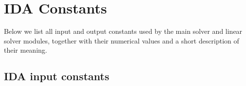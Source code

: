 \chapter{IDA Constants}\label{c:constants}

Below we list all input and output constants used by the main solver and 
linear solver modules, together with their numerical values and a short
description of their meaning.


\newlength{\tcolone}
\newlength{\tcoltwo}
\settowidth{\tcoltwo}{-20}
\newlength{\tcolthree}
\setlength{\tcolthree}{\textwidth}
\addtolength{\tcolthree}{-0.5in}
\addtolength{\tcolthree}{-\tcolone}
\addtolength{\tcolthree}{-\tcoltwo}

\tablefirsthead{}
\tablehead{}
\tabletail{}
\tablelasttail{}


\section{IDA input constants}

